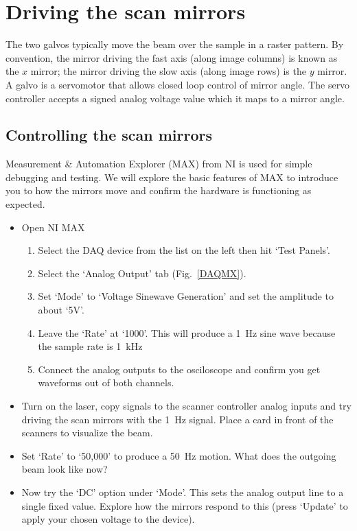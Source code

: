 \documentclass[a4paper]{report}
\begin{document}
\clearpage


\section{Driving the scan mirrors}
The two galvos typically move the beam over the sample in a raster pattern.
By convention, the mirror driving the fast axis (along image columns) is known as the $x$ mirror; the mirror driving the slow axis (along image rows) is the $y$ mirror. 
A galvo is a servomotor that allows closed loop control of mirror angle. 
The servo controller accepts a signed analog voltage value which it maps to a mirror angle. 




\subsection{Controlling the scan mirrors}
Measurement \& Automation Explorer (MAX) from NI is used for simple debugging and testing. 
We will explore the basic features of MAX to introduce you to how the mirrors move and confirm the hardware is functioning as expected. 

\begin{itemize}
    \item Open NI MAX
        \begin{enumerate}
            \setlength\itemsep{0.15em}
            \item Select the DAQ device from the list on the left then hit `Test Panels'. 
            \item Select the `Analog Output' tab (Fig.~\ref{DAQMX}).
            \item Set `Mode' to `Voltage Sinewave Generation' and set the amplitude to about `5V'.
            \item Leave the `Rate' at `1000'. This will produce a 1~Hz sine wave because the sample rate is 1~kHz
            \item Connect the analog outputs to the osciloscope and confirm you get waveforms out of both channels. 
        \end{enumerate}

    \item Turn on the laser, copy signals to the scanner controller analog inputs and try driving the scan mirrors with the 1~Hz signal.  Place a card in front of the scanners to visualize the beam. 
    \item Set `Rate' to `50,000' to produce a 50~Hz motion. What does the outgoing beam look like now?
    \item Now try the `DC' option under `Mode'. This sets the analog output line to a single fixed value. Explore how the mirrors respond to this (press `Update' to apply your chosen voltage to the device).
\end{itemize}
\end{document}
